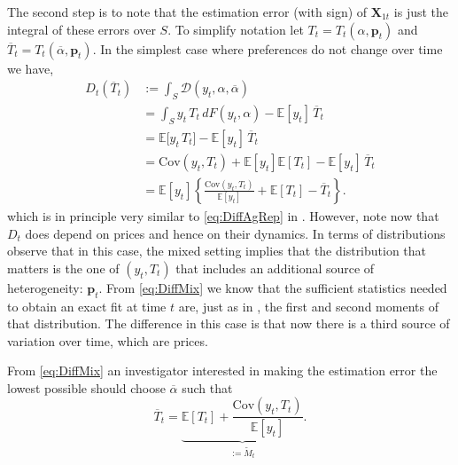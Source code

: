 \documentclass[english, a4paper, 12pt]{article}
\begin{document}
The second step is to note that the estimation error (with sign) of $\mathbf{X}_{1t}$ is just the integral of these errors over $S$. To simplify notation let $T_{t} = T_{t}(\alpha , \mathbf{p}_{t})$ and $\overline{T}_{t} = T_{t}(\overline{\alpha}, \mathbf{p}_{t})$. In the simplest case where preferences do not change over time we have,
	\begin{equation} \label{eq:DiffMix}
	\begin{aligned} 
		D_{t}\left(\overline{T}_{t}\right)
			&:=	\int_{S} \mathcal{D}(y_{t},\alpha,\overline{\alpha})	\\
			&=	\int_{S} y_{t}\,T_{t} \, dF(y_{t},\alpha) - \mathbb{E}[y_{t}]\, \overline{T}_{t}	\\
			&=	\mathbb{E}\big[y_{t} \, T_{t}\big] - \mathbb{E}[y_{t}]\, \overline{T}_{t}		\\
			&=	\mathrm{Cov}\left(y_{t}, T_{t} \right) + \mathbb{E}[y_{t}]\mathbb{E}\left[T_{t}\right] - \mathbb{E}[y_{t}]\, \overline{T}_{t}	\\
			&= 	\mathbb{E}[y_{t}]\left\{ \frac{\mathrm{Cov}\left(y_{t}, T_{t} \right)}{\mathbb{E}[y_{t}]} + \mathbb{E}\left[T_{t}\right] - \overline{T}_{t} \right\}.
	\end{aligned}
	\end{equation}
which is in principle very similar to \eqref{eq:DiffAgRep} in . However, note now that $D_{t}$ does depend on prices and hence on their dynamics. In terms of distributions observe that in this case, the mixed setting implies that the distribution that matters is the one of $(y_{t},T_{t})$ that includes an additional source of heterogeneity: $\mathbf{p}_{t}$. From \eqref{eq:DiffMix} we know that the sufficient statistics needed to obtain an exact fit at time $t$ are, just as in , the first and second moments of that distribution. The difference in this case is that now there is a third source of variation over time, which are prices.


From \eqref{eq:DiffMix} an investigator interested in making the estimation error the lowest possible should choose $\overline{\alpha}$ such that
	\begin{equation} \label{eq:OptT}
		\overline{T}_{t} =  \underbrace{\mathbb{E}\left[T_{t} \right] + \frac{\mathrm{Cov}\left(y_{t}, T_{t} \right)}{\mathbb{E}[y_{t}]}}_{:= \tilde{M}_{t}}.
	\end{equation}
\end{document}
